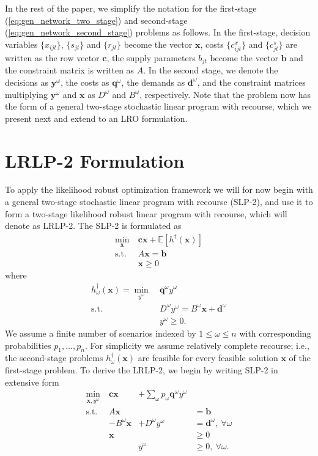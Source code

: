 \documentclass[11pt]{article}
\newcommand{\e}[1]{\mathbb{E} \left[ #1 \right]}
\newcommand{\x}{\mathbf{x}}
\newcommand{\y}{\mathbf{y}}
\renewcommand{\c}{\mathbf{c}}
\newcommand{\q}{\mathbf{q}}
\renewcommand{\b}{\mathbf{b}}
\renewcommand{\d}{\mathbf{d}}
\newcommand{\st}{\mbox{s.t.}}
\begin{document}
In the rest of the paper, we simplify the notation for the first-stage (\ref{eq:gen_network_two_stage}) and second-stage (\ref{eq:gen_network_second_stage}) problems as follows.
In the first-stage, decision variables $\{x_{ijt}\}$, $\{s_{jt}\}$ and $\{r_{jt}\}$ become the vector $\x$, costs $\{c_{ijt}^x\}$ and $\{c_{jt}^s\}$ are written as the row vector $\c$, the supply parameters $b_{jt}$ become the vector $\b$ and the constraint matrix is written as $A$.
In the second stage, we denote the decisions as $\y^\omega$, the costs as $\q^\omega$, the demands as $\d^\omega$, and the constraint matrices multiplying $\y^\omega$ and $\x$ as $D^\omega$ and $B^\omega$, respectively.
Note that the problem now has the form of a general two-stage stochastic linear program with recourse, which we present next and extend to an LRO formulation.

\section{LRLP-2 Formulation} 
\label{sec:lrlp2}

To apply the likelihood robust optimization framework we will for now begin with a general two-stage stochastic linear program with recourse (SLP-2), and use it to form a two-stage likelihood robust linear program with recourse, which will denote as LRLP-2.
The SLP-2 is formulated as
\begin{align*}
	\min_\x \ & \c\x + \e{h^\dagger(\x)} \\
	\st \ & A\x = \b \\
	& \x \geq 0
\end{align*}
where
\begin{align}
	h^\dagger_\omega(\x) = \min_{y^\omega} \ & \q^\omega y^\omega \label{eq:slp_second_stage} \\
	\st \ & D^\omega y^\omega = B^\omega \x + \d^\omega \nonumber \\
	& y^\omega \geq 0. \nonumber
\end{align}
We assume a finite number of scenarios indexed by $1 \leq \omega \leq n$ with corresponding probabilities $p_1, \dots, p_n$.
For simplicity we assume relatively complete recourse; i.e., the second-stage problems $h^\dagger_\omega(\x)$ are feasible for every feasible solution $\x$ of the first-stage problem.
To derive the LRLP-2, we begin by writing SLP-2 in extensive form
\[
	\begin{array}{rrrl}
		\min_{\x,y^\omega} \ & \c\x & + \sum_\omega p_\omega \q^\omega y^\omega \label{eq:slp2cost} \\
		\st \ & A\x & & = \b \nonumber \\
		& -B^\omega \x & + D^\omega y^\omega & = \d^\omega,\ \forall \omega \nonumber \\
		& \x & & \geq 0 \nonumber \\
		& & y^\omega & \geq 0,\ \forall \omega. \nonumber
	\end{array}
\]
\end{document}
